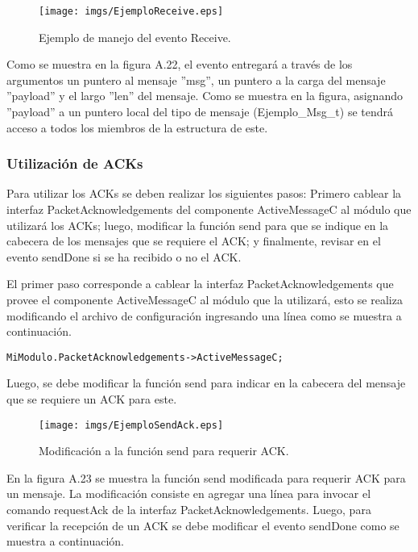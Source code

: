 \begin{center}
\begin{figure}[H]
\centering
\texttt{[image: imgs/EjemploReceive.eps]} 
\caption{Ejemplo de manejo del evento Receive.}
\end{figure}
\end{center}

Como se muestra en la figura A.22, el evento entregará a través de los argumentos un puntero al mensaje ''msg'', un puntero a la carga del mensaje ''payload'' y el largo ''len'' del mensaje. Como se muestra en la figura, asignando ''payload'' a un puntero local del tipo de mensaje (Ejemplo\_Msg\_t) se tendrá acceso a todos los miembros de la estructura de este.

\subsubsection{Utilización de ACKs}
Para utilizar los ACKs se deben realizar los siguientes pasos: Primero cablear la interfaz PacketAcknowledgements del componente ActiveMessageC al módulo que utilizará los ACKs; luego, modificar la función send para que se indique en la cabecera de los mensajes que se requiere el ACK; y finalmente, revisar en el evento sendDone si se ha recibido o no el ACK.

El primer paso corresponde a cablear la interfaz PacketAcknowledgements que provee el componente ActiveMessageC al módulo que la utilizará, esto se realiza modificando el archivo de configuración ingresando una línea como se muestra a continuación.

\begin{verbatim}
MiModulo.PacketAcknowledgements->ActiveMessageC;
\end{verbatim}

Luego, se debe modificar la función send para indicar en la cabecera del mensaje que se requiere un ACK para este.

\begin{center}
\begin{figure}[H]
\centering
\texttt{[image: imgs/EjemploSendAck.eps]} 
\caption{Modificación a la función send para requerir ACK.}
\end{figure}
\end{center}

En la figura A.23 se muestra la función send modificada para requerir ACK para un mensaje. La modificación consiste en agregar una línea para invocar el comando requestAck de la interfaz PacketAcknowledgements. Luego, para verificar la recepción de un ACK se debe modificar el evento sendDone como se muestra a continuación.

